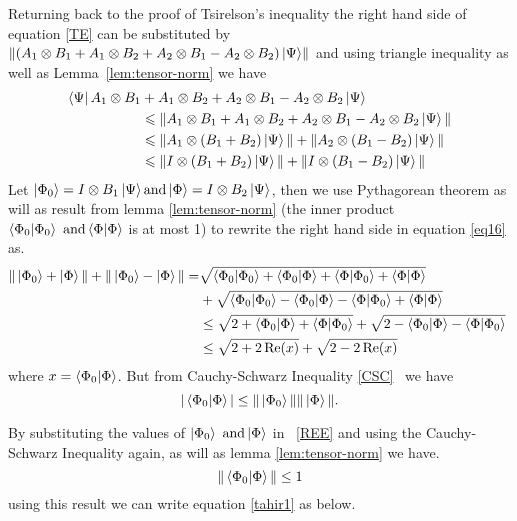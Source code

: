 Returning back to the proof of  Tsirelson’s inequality the right hand side of equation \ref{TE}  can be substituted by
$\left\| \left(A_1\otimes B_1+ A_1\otimes B_2+A_2\otimes B_1 -A_2\otimes B_2
    \right)\ket{\Psi}\right\|$ and  using   triangle inequality as well as Lemma~\ref{lem:tensor-norm} we have
\begin{align}
\bra{\Psi}A_1\otimes B_1 &+ A_1\otimes B_2+A_2\otimes B_1 -A_2\otimes B_2\ket{\Psi} \\
&\leqslant  \| A_1\otimes B_1+ A_1\otimes B_2+A_2\otimes B_1 -A_2\otimes B_2\ket{\Psi}\| \nonumber\\
&\leqslant \| A_1\otimes (B_1+ B_2)\ket{\Psi}\| +\| A_2\otimes( B_1 - B_2)\ket{\Psi}\|\nonumber \\
&\leqslant \| I\otimes (B_1+ B_2)\ket{\Psi}\| +\| I\otimes( B_1 - B_2)\ket{\Psi}\|\label{eq16}
\end{align}
Let $\ket{\Phi_0}=I\otimes B_1\ket{\Psi} \text{and}\ket{\Phi}=I\otimes B_2\ket{\Psi}$, then we  use  Pythagorean theorem as will as result from lemma \ref{lem:tensor-norm} (the inner product $\bra{\Phi_0}\ket{\Phi_0} \text{ and}\bra{\Phi}\ket{\Phi}$  is at most 1) to  rewrite the right hand side in equation \ref{eq16} as.
\begin{align}
\| \ket{\Phi_0}+ \ket{\Phi}\| +\| \ket{\Phi_0}- \ket{\Phi}\| = &\sqrt{\bra{\Phi_0}\ket{\Phi_0}+\bra{\Phi_0}\ket{\Phi}+\bra{\Phi}\ket{\Phi_0}+\bra{\Phi}\ket{\Phi}}\nonumber\\
&+\sqrt{\bra{\Phi_0}\ket{\Phi_0}-\bra{\Phi_0}\ket{\Phi}-\bra{\Phi}\ket{\Phi_0}+\bra{\Phi}\ket{\Phi}}\nonumber\\
 &\leq \sqrt{2+\bra{\Phi_0}\ket{\Phi}+\bra{\Phi}\ket{\Phi_0}}+\sqrt{2-\bra{\Phi_0}\ket{\Phi}-\bra{\Phi}\ket{\Phi_0}}\
\nonumber\\
&\leq \sqrt{2+2\Re(x)}+\sqrt{2-2\Re(x)}\label{tahir1}
\end{align} 
where $x= \bra{\Phi_0}\ket{\Phi}$. But from  Cauchy-Schwarz Inequality \ref{CSC}~ we have 
\begin{equation}\label{REE}
|\bra{\Phi_0}\ket{\Phi}|\leq \|\ket{\Phi_0}\|\|\ket{\Phi}\|.
\end{equation}


By substituting the values of $\ket{\Phi_0} \text{ and} \ket{\Phi}$ in ~\ref{REE} and using the Cauchy-Schwarz Inequality again, as will as lemma \ref{lem:tensor-norm} we have.
\begin{equation}
\|\bra{\Phi_0}\ket{\Phi}\|\leq 1
\end{equation}
using this result we can write equation \ref{tahir1} as below.

